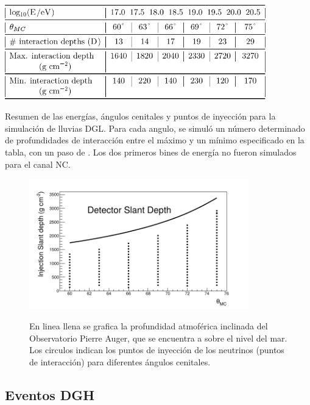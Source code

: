 		\begin{table}[ht]
			\begin{center}
			\includegraphics[width=0.85\textwidth]{fig/simulacionAuger/simShNavarro_1}
			\end{center}
			\caption{Resumen de las energías, ángulos cenitales y puntos de inyección para la simulación de lluvias DGL. Para cada angulo, se simuló un número determinado de profundidades de interacción entre el máximo y un mínimo especificado en la tabla, con un paso de . Los dos primeros bines de energía no fueron simulados para el canal NC.
			}
			\label{tab:sim_table_dgl}
		\end{table}
		\begin{figure}[h!]
			\begin{center}
			\includegraphics[width=0.85\textwidth]{fig/simulacionAuger/simShNavarro_2}\\
			\caption{En linea llena se grafica la profundidad atmoférica inclinada del Observatorio Pierre Auger, que se encuentra a  sobre el nivel del mar.
			Los circulos indican los puntos de inyección de los neutrinos (puntos de interacción) para diferentes ángulos cenitales.
			}
			\label{fig:sim_fig_dgl}
			\end{center}
		\end{figure}
		
		
		\subsection{Eventos DGH}
		
